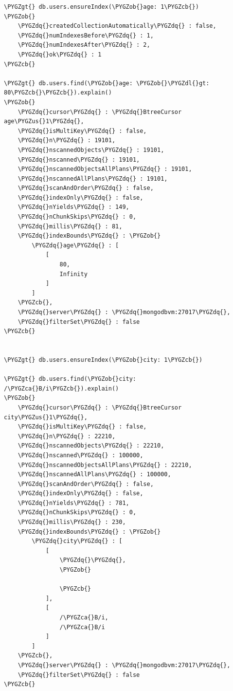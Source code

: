 \documentclass[a4paper,10pt,english]{sphinxmanual}
\def\PYGZus{\char`\_}
\def\PYGZob{\char`\{}
\def\PYGZcb{\char`\}}
\def\PYGZca{\char`\^}
\def\PYGZgt{\char`\>}
\def\PYGZdl{\char`\$}
\def\PYGZdq{\char`\"}
\begin{document}
\begin{Verbatim}[commandchars=\\\{\}]
\PYGZgt{} db.users.ensureIndex(\PYGZob{}age: 1\PYGZcb{})
\PYGZob{}
    \PYGZdq{}createdCollectionAutomatically\PYGZdq{} : false,
    \PYGZdq{}numIndexesBefore\PYGZdq{} : 1,
    \PYGZdq{}numIndexesAfter\PYGZdq{} : 2,
    \PYGZdq{}ok\PYGZdq{} : 1
\PYGZcb{}

\PYGZgt{} db.users.find(\PYGZob{}age: \PYGZob{}\PYGZdl{}gt: 80\PYGZcb{}\PYGZcb{}).explain()
\PYGZob{}
    \PYGZdq{}cursor\PYGZdq{} : \PYGZdq{}BtreeCursor age\PYGZus{}1\PYGZdq{},
    \PYGZdq{}isMultiKey\PYGZdq{} : false,
    \PYGZdq{}n\PYGZdq{} : 19101,
    \PYGZdq{}nscannedObjects\PYGZdq{} : 19101,
    \PYGZdq{}nscanned\PYGZdq{} : 19101,
    \PYGZdq{}nscannedObjectsAllPlans\PYGZdq{} : 19101,
    \PYGZdq{}nscannedAllPlans\PYGZdq{} : 19101,
    \PYGZdq{}scanAndOrder\PYGZdq{} : false,
    \PYGZdq{}indexOnly\PYGZdq{} : false,
    \PYGZdq{}nYields\PYGZdq{} : 149,
    \PYGZdq{}nChunkSkips\PYGZdq{} : 0,
    \PYGZdq{}millis\PYGZdq{} : 81,
    \PYGZdq{}indexBounds\PYGZdq{} : \PYGZob{}
        \PYGZdq{}age\PYGZdq{} : [
            [
                80,
                Infinity
            ]
        ]
    \PYGZcb{},
    \PYGZdq{}server\PYGZdq{} : \PYGZdq{}mongodbvm:27017\PYGZdq{},
    \PYGZdq{}filterSet\PYGZdq{} : false
\PYGZcb{}


\PYGZgt{} db.users.ensureIndex(\PYGZob{}city: 1\PYGZcb{})

\PYGZgt{} db.users.find(\PYGZob{}city: /\PYGZca{}B/i\PYGZcb{}).explain()
\PYGZob{}
    \PYGZdq{}cursor\PYGZdq{} : \PYGZdq{}BtreeCursor city\PYGZus{}1\PYGZdq{},
    \PYGZdq{}isMultiKey\PYGZdq{} : false,
    \PYGZdq{}n\PYGZdq{} : 22210,
    \PYGZdq{}nscannedObjects\PYGZdq{} : 22210,
    \PYGZdq{}nscanned\PYGZdq{} : 100000,
    \PYGZdq{}nscannedObjectsAllPlans\PYGZdq{} : 22210,
    \PYGZdq{}nscannedAllPlans\PYGZdq{} : 100000,
    \PYGZdq{}scanAndOrder\PYGZdq{} : false,
    \PYGZdq{}indexOnly\PYGZdq{} : false,
    \PYGZdq{}nYields\PYGZdq{} : 781,
    \PYGZdq{}nChunkSkips\PYGZdq{} : 0,
    \PYGZdq{}millis\PYGZdq{} : 230,
    \PYGZdq{}indexBounds\PYGZdq{} : \PYGZob{}
        \PYGZdq{}city\PYGZdq{} : [
            [
                \PYGZdq{}\PYGZdq{},
                \PYGZob{}

                \PYGZcb{}
            ],
            [
                /\PYGZca{}B/i,
                /\PYGZca{}B/i
            ]
        ]
    \PYGZcb{},
    \PYGZdq{}server\PYGZdq{} : \PYGZdq{}mongodbvm:27017\PYGZdq{},
    \PYGZdq{}filterSet\PYGZdq{} : false
\PYGZcb{}
\end{Verbatim}
\end{document}
